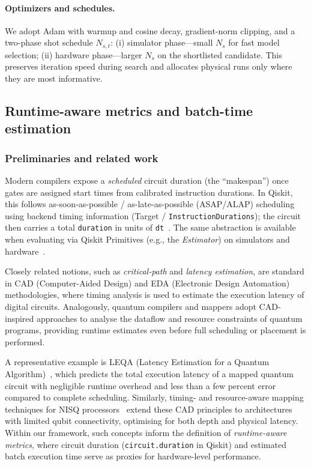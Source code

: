 \paragraph{Optimizers and schedules.}
We adopt Adam with warmup and cosine decay, gradient-norm clipping, and a two-phase shot schedule $N_{s,t}$: (i) simulator phase—small $N_s$ for fast model selection; (ii) hardware phase—larger $N_s$ on the shortlisted candidate. This preserves iteration speed during search and allocates physical runs only where they are most informative.

\subsection{Runtime-aware metrics and batch-time estimation}
\label{sec:runtime-metric}

\subsubsection*{Preliminaries and related work}
Modern compilers expose a \emph{scheduled} circuit duration (the “makespan”) once gates are assigned start times from calibrated instruction durations. In Qiskit, this follows as-soon-as-possible / as-late-as-possible (ASAP/ALAP) scheduling using backend timing information (Target / \texttt{InstructionDurations}); the circuit then carries a total \texttt{duration} in units of \texttt{dt}~\cite{InstructionDurations,ASAPScheduleAnalysis,McKay2018BackendSpec,QiskitBackendV2Docs,QiskitTargetDocs,OpenQASM3TQC2022}. The same abstraction is available when evaluating via Qiskit Primitives (e.g., the \emph{Estimator}) on simulators and hardware~\cite{QiskitEstimatorDocs,Qiskit2019}. 


Closely related notions, such as \emph{critical-path} and \emph{latency estimation}, are standard in CAD (Computer-Aided Design) and EDA (Electronic Design Automation) methodologies, where timing analysis is used to estimate the execution latency of digital circuits.  
Analogously, quantum compilers and mappers adopt CAD-inspired approaches to analyse the dataflow and resource constraints of quantum programs, providing runtime estimates even before full scheduling or placement is performed.

A representative example is \textsc{LEQA} (Latency Estimation for a Quantum Algorithm)~\cite{Dousti2013LEQA}, 
which predicts the total execution latency of a mapped quantum circuit with negligible runtime overhead and less than a few percent error compared to complete scheduling.  
Similarly, timing- and resource-aware mapping techniques for NISQ processors~\cite{Lao2020TimingMapping} 
extend these CAD principles to architectures with limited qubit connectivity, optimising for both depth and physical latency.  
Within our framework, such concepts inform the definition of \emph{runtime-aware metrics}, 
where circuit duration (\texttt{circuit.duration} in Qiskit) and estimated batch execution time serve as proxies for hardware-level performance.


